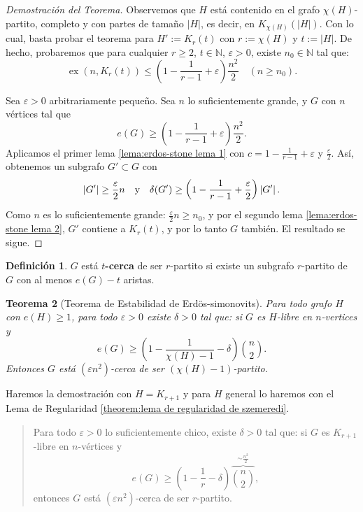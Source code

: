 \documentclass[12pt]{report}
\theoremstyle{plain}
\newtheorem{theorem}{Teorema}[section]
\theoremstyle{definition}
\newtheorem{definition}[theorem]{Definición}
\newcommand{\naturals}{\mathbb{N}}
\newcommand{\abs}[1]{\left \vert #1 \right \vert}
\newcommand{\ex}[2]{\operatorname{ex} (#1, #2)}
\begin{document}
\begin{proof}[Demostración del Teorema]
Observemos que $H$ está contenido en el grafo $\chi (H)$-partito, completo y con partes de tamaño $\abs H$, es decir, en $K_{\chi (H)} (\abs H)$. Con lo cual, basta probar el teorema para $H' := K_{r} (t)$ con $r := \chi (H)$ y $t := \abs H$. De hecho, probaremos que para cualquier $r \geq 2$, $t \in \naturals$, $ \varepsilon > 0$, existe $n_0 \in \naturals$ tal que:
\[
    \ex n { K_{r} (t)} \leq \left (1 - \frac 1 {r-1} + \varepsilon \right ) \frac{n^2}{2} \quad (n \geq n_0).
\]

Sea $\varepsilon > 0$ arbitrariamente pequeño. Sea $n$ lo suficientemente grande, y $G$ con $n$ vértices tal que
\[
    e(G) \geq \left ( 1 - \frac 1 {r-1} + \varepsilon \right ) \frac{n^2}{2}.
\]
Aplicamos el primer lema \ref{lema:erdos-stone lema 1} con $c = 1 - \frac 1 {r-1} + \varepsilon$ y $\frac{\varepsilon}{2}$. Así, obtenemos un subgrafo $G' \subset G$ con
\[
    \abs{G'} \geq \frac{\varepsilon}{2} n \quad \text y \quad \delta (G') \geq \left ( 1 - \frac 1 {r-1} + \frac{\varepsilon}{2} \right ) \abs{G'}.
\]
Como $n$ es lo suficientemente grande: $\frac{\varepsilon}{2} n \geq n_0$, y por el segundo lema \ref{lema:erdos-stone lema 2}, $G'$ contiene a $K_{r} (t)$, y por lo tanto $G$ también. El resultado se sigue.
\end{proof}


\begin{definition}
$G$ está \textbf{$t$-cerca} de ser $r$-partito si existe un subgrafo $r$-partito de $G$ con al menos $e(G) - t$ aristas.
\end{definition}





\begin{theorem}[Teorema de Estabilidad de Erdös-simonovits]\label{Teorema de Estabilidad de Erdos-simonovits version H general}
Para todo grafo $H$ con $e(H) \geq 1$, para todo $\varepsilon > 0$ existe $\delta > 0$ tal que: si $G$ es $H$-libre en $n$-vertices y
\[
    e(G) \geq \left ( 1 - \frac {1}{\chi (H) - 1} - \delta \right) \binom n 2.
\]
Entonces $G$ está $(\varepsilon n^2)$-cerca de ser $(\chi (H) - 1)$-partito.
\end{theorem}

Haremos la demostración con $H = K_{r+1}$ y para $H$ general lo haremos con el Lema de Regularidad \ref{theorem:lema de regularidad de szemeredi}.

\begin{quote}\label{Teorema de Estabilidad de Erdos-simonovits version H un r+1 completo}
Para todo $\varepsilon > 0$ lo suficientemente chico, existe $\delta > 0$ tal que: si $G$ es $K_{r+1}$-libre en $n$-vértices y
\[
    e(G) \geq \left ( 1 - \frac 1 r - \delta\right) \overbrace{\binom n 2}^{\sim \frac {n^2}2},
\]
entonces $G$ está $(\varepsilon n^2)$-cerca de ser $r$-partito.
\end{quote}
\end{document}
